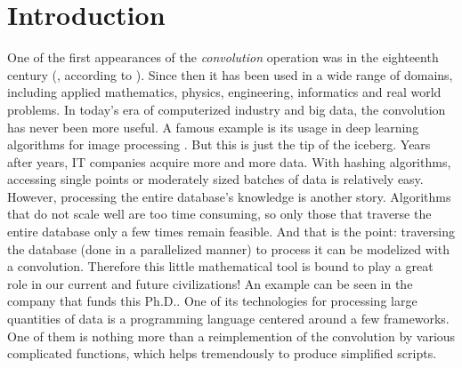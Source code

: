 \chapter*{Introduction}\label{chp:int}

One of the first appearances of the \emph{convolution} operation was in the eighteenth century (\cite{d1754traite}, according to \cite{dominguezorigin}). Since then it has been used in a wide range of domains, including applied mathematics, physics, engineering, informatics and real world problems. In today's era of computerized industry and big data, the convolution has never been more useful. A famous example is its usage in deep learning algorithms for image processing \citep{lecun2015deep}. But this is just the tip of the iceberg. Years after years, IT companies acquire more and more data. With hashing algorithms, accessing single points or moderately sized batches of data is relatively easy. However, processing the entire database's knowledge is another story. Algorithms that do not scale well are too time consuming, so only those that traverse the entire database only a few times remain feasible. And that is the point: traversing the database (done in a parallelized manner) to process it can be modelized with a convolution. Therefore this little mathematical tool is bound to play a great role in our current and future civilizations! %
An example can be seen in the company that funds this Ph.D.. One of its technologies for processing large quantities of data is a programming language centered around a few frameworks. One of them %
is nothing more than a reimplemention of the convolution by various complicated functions, which helps tremendously to produce simplified scripts.


